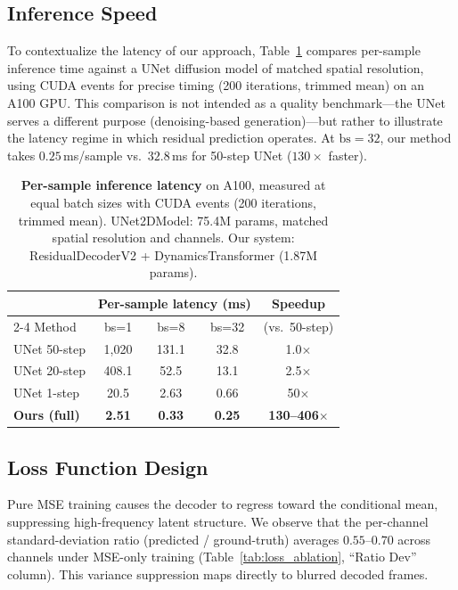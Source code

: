 \documentclass{article}
\begin{document}
\subsection{Inference Speed}
\label{sec:speed}

To contextualize the latency of our approach, Table~\ref{tab:speed}
compares per-sample inference time against a UNet diffusion model of
matched spatial resolution, using CUDA events for precise timing
(200 iterations, trimmed mean) on an A100 GPU.
This comparison is not intended as a quality benchmark---the UNet
serves a different purpose (denoising-based generation)---but rather
to illustrate the latency regime in which residual prediction operates.
At $\text{bs}{=}32$, our method takes $0.25$\,ms/sample vs.\
$32.8$\,ms for 50-step UNet ($130\times$ faster).

\begin{table}[t]
\centering
\caption{%
  \textbf{Per-sample inference latency} on A100, measured at
  equal batch sizes with CUDA events (200 iterations, trimmed mean).
  UNet2DModel: 75.4M params, matched spatial resolution and channels.
  Our system: ResidualDecoderV2 + DynamicsTransformer (1.87M params).
}
\label{tab:speed}
\begin{tabular}{@{}lcccc@{}}
\toprule
& \multicolumn{3}{c}{Per-sample latency (ms)} & Speedup \\
\cmidrule(lr){2-4}
Method & bs=1 & bs=8 & bs=32 & (vs.\ 50-step) \\
\midrule
UNet 50-step   & 1{,}020 & 131.1 & 32.8 & 1.0$\times$ \\
UNet 20-step   & 408.1 & 52.5 & 13.1 & 2.5$\times$ \\
UNet 1-step    & 20.5 & 2.63 & 0.66 & 50$\times$ \\
\textbf{Ours (full)} & \textbf{2.51} & \textbf{0.33} & \textbf{0.25} & \textbf{130--406}$\times$ \\
\bottomrule
\end{tabular}
\end{table}

\subsection{Loss Function Design}
\label{sec:loss}

Pure MSE training causes the decoder to regress toward the conditional
mean, suppressing high-frequency latent structure.
We observe that the per-channel standard-deviation ratio
(predicted / ground-truth) averages $0.55$--$0.70$ across channels
under MSE-only training (Table~\ref{tab:loss_ablation}, ``Ratio Dev''
column).
This variance suppression maps directly to blurred decoded frames.
\end{document}
